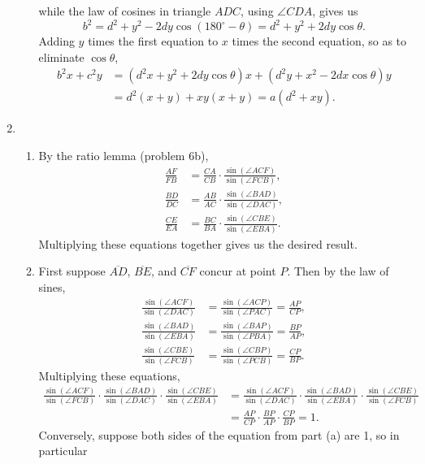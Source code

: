 \begin{enumerate}
\begin{enumerate}
while the law of cosines in triangle $ADC$, using $\angle CDA$, gives us
\begin{equation*}
b^2 = d^2 + y^2 - 2dy\cos(180^{\circ} - \theta) = d^2 + y^2 + 2dy\cos\theta.
\end{equation*}
Adding $y$ times the first equation to $x$ times the second equation, so as to eliminate $\cos\theta$,
\begin{align*}
b^2x + c^2y &= (d^2x + y^2 + 2dy\cos\theta)x + (d^2y + x^2 - 2dx\cos\theta)y \\
&= d^2(x + y) + xy(x + y) = a(d^2 + xy).
\end{align*}
\end{enumerate}
\item \begin{enumerate}
\item By the ratio lemma (problem 6b),
\begin{align*}
\frac{AF}{FB} &= \frac{CA}{CB}\cdot\frac{\sin(\angle ACF)}{\sin(\angle FCB)}, \\
\frac{BD}{DC} &= \frac{AB}{AC}\cdot\frac{\sin(\angle BAD)}{\sin(\angle DAC)}, \\
\frac{CE}{EA} &= \frac{BC}{BA}\cdot\frac{\sin(\angle CBE)}{\sin(\angle EBA)}.
\end{align*}
Multiplying these equations together gives us the desired result.
\item First suppose $\overline{AD}$, $\overline{BE}$, and $\overline{CF}$ concur at point $P$. Then by the law of sines,
\begin{align*}
\frac{\sin(\angle ACF)}{\sin(\angle DAC)} &= \frac{\sin(\angle ACP)}{\sin(\angle PAC)} = \frac{AP}{CP}, \\
\frac{\sin(\angle BAD)}{\sin(\angle EBA)} &= \frac{\sin(\angle BAP)}{\sin(\angle PBA)} = \frac{BP}{AP}, \\
\frac{\sin(\angle CBE)}{\sin(\angle FCB)} &= \frac{\sin(\angle CBP)}{\sin(\angle PCB)} = \frac{CP}{BP}.
\end{align*}
Multiplying these equations,
\begin{align*}
\frac{\sin(\angle ACF)}{\sin(\angle FCB)}\cdot\frac{\sin(\angle BAD)}{\sin(\angle DAC)}\cdot\frac{\sin(\angle CBE)}{\sin(\angle EBA)} &= \frac{\sin(\angle ACF)}{\sin(\angle DAC)}\cdot\frac{\sin(\angle BAD)}{\sin(\angle EBA)}\cdot\frac{\sin(\angle CBE)}{\sin(\angle FCB)} \\
&= \frac{AP}{CP}\cdot\frac{BP}{AP}\cdot\frac{CP}{BP} = 1.
\end{align*}
Conversely, suppose both sides of the equation from part (a) are 1, so in particular

\end{enumerate}
\end{enumerate}

